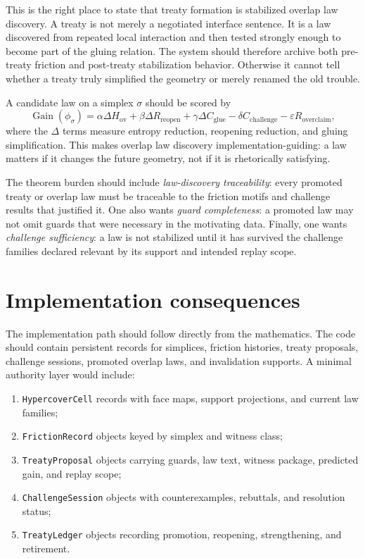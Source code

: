 \documentclass[11pt]{report}
\begin{document}
This is the right place to state that treaty formation is stabilized overlap law discovery. A treaty is not merely a negotiated interface sentence. It is a law discovered from repeated local interaction and then tested strongly enough to become part of the gluing relation. The system should therefore archive both pre-treaty friction and post-treaty stabilization behavior. Otherwise it cannot tell whether a treaty truly simplified the geometry or merely renamed the old trouble.

A candidate law on a simplex $\sigma$ should be scored by
\[
\operatorname{Gain}(\phi_\sigma)
=
\alpha \Delta H_{\mathrm{ov}}
+
\beta \Delta R_{\mathrm{reopen}}
+
\gamma \Delta C_{\mathrm{glue}}
-
\delta C_{\mathrm{challenge}}
-
\varepsilon R_{\mathrm{overclaim}},
\]
where the $\Delta$ terms measure entropy reduction, reopening reduction, and gluing simplification. This makes overlap law discovery implementation-guiding: a law matters if it changes the future geometry, not if it is rhetorically satisfying.

The theorem burden should include \emph{law-discovery traceability}: every promoted treaty or overlap law must be traceable to the friction motifs and challenge results that justified it. One also wants \emph{guard completeness}: a promoted law may not omit guards that were necessary in the motivating data. Finally, one wants \emph{challenge sufficiency}: a law is not stabilized until it has survived the challenge families declared relevant by its support and intended replay scope.

\section{Implementation consequences}
The implementation path should follow directly from the mathematics. The code should contain persistent records for simplices, friction histories, treaty proposals, challenge sessions, promoted overlap laws, and invalidation supports. A minimal authority layer would include:
\begin{enumerate}
\item \texttt{HypercoverCell} records with face maps, support projections, and current law families;
\item \texttt{FrictionRecord} objects keyed by simplex and witness class;
\item \texttt{TreatyProposal} objects carrying guards, law text, witness package, predicted gain, and replay scope;
\item \texttt{ChallengeSession} objects with counterexamples, rebuttals, and resolution status;
\item \texttt{TreatyLedger} objects recording promotion, reopening, strengthening, and retirement.
\end{enumerate}
\end{document}
